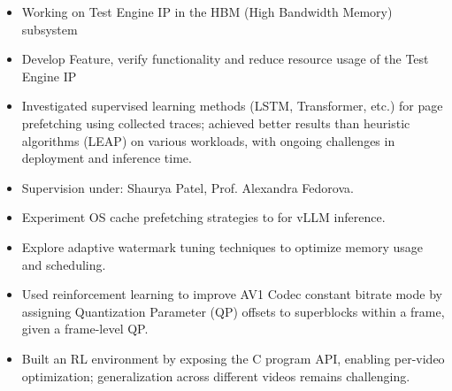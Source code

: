 \documentclass[10pt,a4paper,ragged2e,withhyper]{altacv}
\begin{document}
\begin{paracol}{2}

\begin{itemize}
  \item Working on Test Engine IP in the HBM (High Bandwidth Memory) subsystem
  \item Develop Feature, verify functionality and reduce resource usage of the Test Engine IP
\end{itemize}

\divider

\begin{itemize}
\item Investigated supervised learning methods (LSTM, Transformer, etc.) for page prefetching using collected traces; achieved better results than heuristic algorithms (LEAP) on various workloads, with ongoing challenges in deployment and inference time.
\item Supervision under: Shaurya Patel, Prof. Alexandra Fedorova.
\end{itemize}


\begin{itemize}
  \item Experiment OS cache prefetching strategies to for vLLM inference.
  \item Explore adaptive watermark tuning techniques to optimize memory usage and scheduling.
\end{itemize}

\divider

\begin{itemize}
  \item Used reinforcement learning to improve AV1 Codec constant bitrate mode by assigning Quantization Parameter (QP) offsets to superblocks within a frame, given a frame-level QP.
  \item Built an RL environment by exposing the C program API, enabling per-video optimization; generalization across different videos remains challenging.
\end{itemize}


\end{paracol}
\end{document}

